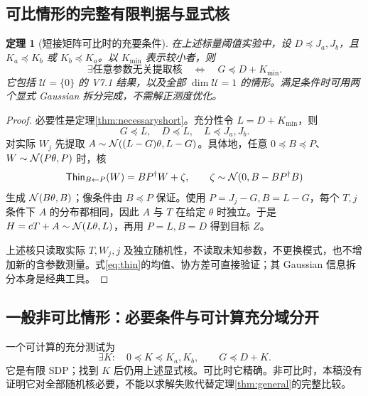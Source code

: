 \documentclass[UTF8,fontset=fandol,zihao=5,a4paper]{ctexart}
\newtheorem{theorem}{定理}[section]
\theoremstyle{definition}
\theoremstyle{remark}\newtheorem{remark}[theorem]{说明}
\numberwithin{equation}{section}
\begin{document}
\subsection{可比情形的完整有限判据与显式核}
\begin{theorem}[短接矩阵可比时的充要条件]
\label{thm:comparable}
在上述标量阈值实验中，设 $D\preceq J_a,J_b$，且 $K_a\preceq K_b$ 或 $K_b\preceq K_a$。以 $K_{\min}$ 表示较小者，则
\begin{equation}
\boxed{\exists\text{任意参数无关提取核}
\quad\Longleftrightarrow\quad G\preceq D+K_{\min}.}
\label{eq:completefinite}
\end{equation}
它包括 $\mathcal U=\{0\}$ 的 V7.1 结果，以及全部 $\dim\mathcal U=1$ 的情形。满足条件时可用两个显式 Gaussian 拆分完成，不需解正测度优化。
\end{theorem}
\begin{proof}
必要性是定理\ref{thm:necessaryshort}。充分性令 $L=D+K_{\min}$，则
\[
G\preceq L,\quad D\preceq L,\quad L\preceq J_a,J_b.
\]
对实际 $W_j$ 先提取 $A\sim\mathcal N((L-G)\theta,L-G)$。具体地，任意 $0\preceq B\preceq P$、$W\sim\mathcal N(P\theta,P)$ 时，核
\begin{equation}
\mathsf{Thin}_{B\leftarrow P}(W)
=BP^\dagger W+\zeta,
\qquad\zeta\sim\mathcal N(0,B-BP^\dagger B)
\label{eq:thin}
\end{equation}
生成 $\mathcal N(B\theta,B)$；像条件由 $B\preceq P$ 保证。使用 $P=J_j-G,B=L-G$，每个 $T,j$ 条件下 $A$ 的分布都相同，因此 $A$ 与 $T$ 在给定 $\theta$ 时独立。于是 $H=cT+A\sim\mathcal N(L\theta,L)$，再用 $P=L,B=D$ 得到目标 $Z$。

上述核只读取实际 $T,W_j,j$ 及独立随机性，不读取未知参数，不更换模式，也不增加新的含参数测量。式\eqref{eq:thin}的均值、协方差可直接验证；其 Gaussian 信息拆分本身是经典工具\cite{xiao,thinning}。
\end{proof}

\subsection{一般非可比情形：必要条件与可计算充分域分开}
一个可计算的充分测试为
\begin{equation}
\exists K:\quad0\preceq K\preceq K_a,K_b,
\qquad G\preceq D+K.
\label{eq:innerSDP}
\end{equation}
它是有限 SDP；找到 $K$ 后仍用上述显式核。可比时它精确。非可比时，本稿没有证明它对全部随机核必要，不能以求解失败代替定理\ref{thm:general}的完整比较。
\end{document}
